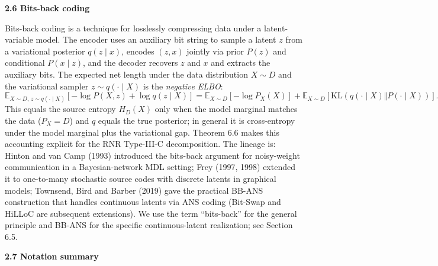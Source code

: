 \documentclass[
]{article}
\begin{document}
\textbf{2.6 Bits-back coding}

Bits-back coding is a technique for losslessly compressing data under
a latent-variable model. The encoder uses an auxiliary bit string to
sample a latent $z$ from a variational posterior $q(z \mid x)$,
encodes $(z, x)$ jointly via prior $P(z)$ and conditional
$P(x \mid z)$, and the decoder recovers $z$ and $x$ and extracts the
auxiliary bits. The expected net length under the data distribution
$X \sim D$ and the variational sampler $z \sim q(\cdot \mid X)$ is
the \emph{negative ELBO}:
\[
\mathbb{E}_{X \sim D,\, z \sim q(\cdot \mid X)} \!\left[-\log P(X, z) + \log q(z \mid X)\right]
= \mathbb{E}_{X \sim D}\!\left[-\log P_X(X)\right]
+ \mathbb{E}_{X \sim D}\!\left[\mathrm{KL}(q(\cdot \mid X) \Vert P(\cdot \mid X))\right].
\]
This equals the source entropy $H_D(X)$ only when the model marginal
matches the data ($P_X = D$) and $q$ equals the true posterior; in
general it is cross-entropy under the model marginal plus the
variational gap. Theorem 6.6 makes this accounting explicit for the
RNR Type-III-C decomposition. The lineage is: Hinton and van Camp
(1993) introduced the bits-back argument for noisy-weight
communication in a Bayesian-network MDL setting; Frey (1997, 1998)
extended it to one-to-many stochastic source codes with discrete
latents in graphical models; Townsend, Bird and Barber (2019) gave
the practical BB-ANS construction that handles continuous latents via
ANS coding (Bit-Swap and HiLLoC are subsequent extensions). We use
the term ``bits-back'' for the general principle and BB-ANS for the
specific continuous-latent realization; see Section 6.5.

\textbf{2.7 Notation summary}
\end{document}
